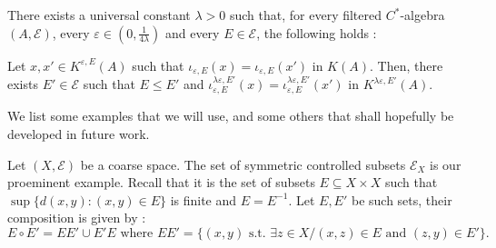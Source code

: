 \begin{rk}\label{approximation}
There exists a universal constant $\lambda >0$ such that, for every filtered $C^*$-algebra $(A,\mathcal E)$, every $\varepsilon\in (0,\frac{1}{4\lambda})$ and every $E\in \mathcal E$, the following holds :

Let $x,x'\in K^{\varepsilon,E}(A)$ such that $ \iota_{\varepsilon,E}(x) = \iota_{\varepsilon,E}(x')$ in $K(A)$. Then, there exists $E'\in\mathcal E$ such that $E\leq E'$ and $\iota_{\varepsilon,E}^{\lambda\varepsilon,E'}(x)=\iota_{\varepsilon,E}^{\lambda\varepsilon,E'}(x')$ in $K^{\lambda\varepsilon,E'}(A)$.
\end{rk}



We list some examples that we will use, and some others that shall hopefully be developed in future work.

\begin{Expl}
Let $(X,\mathcal E)$ be a coarse space. The set of symmetric controlled subsets $\mathcal E_X$ is our proeminent example. Recall that it is the set of subsets $E\subseteq X\times X$ such that $\sup \{ d(x,y) : (x,y)\in E\}$ is finite and $E=E^{-1}$. Let $E,E'$ be such sets, their composition is given by :
\[E\circ E' = EE' \cup E'E \text{ where }EE' = \{(x,y) \text{ s.t. }\exists z\in X / (x,z)\in E \text{ and }(z,y)\in E'\}.\]
\end{Expl}

